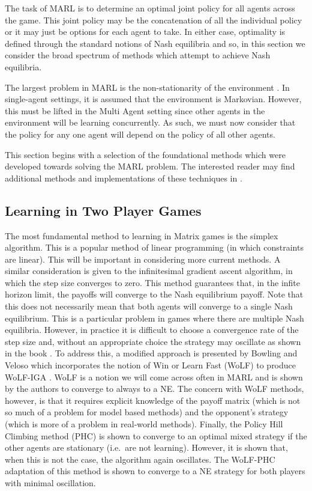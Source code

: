 \documentclass[.../main.tex]{subfiles}
\begin{document}
The task of MARL is to determine an optimal joint policy for all
agents across the game. This joint policy may be the concatenation of
all the individual policy or it may just be options for each agent to
take. In either case, optimality is defined through the standard
notions of Nash equilibria and so, in this section we
consider the broad spectrum of methods which attempt to achieve
Nash equilibria. 

The largest problem in MARL is the non-stationarity
of the environment \cite{Hernandez-LealA}. In single-agent settings,
it is assumed that the environment is Markovian.  However, this must
be lifted in the Multi Agent setting since other agents in the
environment will be learning concurrently. As such, we must now
consider that the policy for any one agent will depend on the policy
of all other agents.

This section begins with a selection of the foundational methods which
were developed towards solving the MARL problem. The interested reader
may find additional methods and implementations of these techniques in
\cite{SchwartzMulti-agentApproach}.

\subsection{Learning in Two Player Games} \label{sec::Two_Player_Games}

The most fundamental method to learning in Matrix games is the simplex
algorithm. This is a popular method of linear programming (in which
constraints are linear). This will be important in considering more
current methods. A similar consideration is given to the infinitesimal
gradient ascent algorithm, in which the step size converges to
zero. This method guarantees that, in the infite horizon limit, the
payoffs will converge to the Nash equilibrium payoff. Note that this
does not necessarily mean that both agents will converge to a single
Nash equilibrium. This is a particular problem in games where there
are multiple Nash equilibria. However, in practice it is difficult to
choose a convergence rate of the step size and, without an appropriate
choice the strategy may oscillate as shown in the book \cite{SchwartzMulti-agentApproach}. To
address
this, a modified approach is presented by Bowling and Veloso which
incorporates the notion of Win or Learn Fast (WoLF) to produce
WoLF-IGA \cite{Bowling2002}.  WoLF is a notion we will come across
often in MARL and is shown by the authors to converge to always to a
NE. The concern with WoLF methods, however, is that it requires
explicit knowledge of the payoff matrix (which is not so much of a
problem for model based methods) and the opponent's strategy (which is
more of a problem in real-world methods). Finally, the Policy Hill
Climbing method (PHC) is shown to converge to an optimal mixed
strategy if the other agents are stationary (i.e.~are not
learning). However, it is shown that, when this is not the case, the
algorithm again oscillates. The WoLF-PHC adaptation of this method is
shown to converge to a NE strategy for both players with minimal
oscillation.
\end{document}
